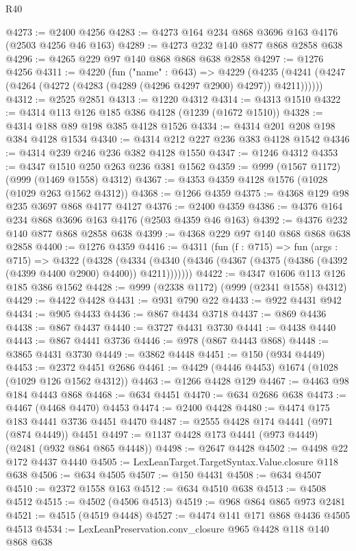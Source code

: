\begin{lexlean}{R40}
\begin{coremodule}
@4273 := @2400 @4256
@4283 := @4273 @164 @234 @868 @3696 @163 @4176 (@2503 @4256 @46 @163)
@4289 := @4273 @232 @140 @877 @868 @2858 @638
@4296 := @4265 @229 @97 @140 @868 @868 @638 @2858
@4297 := @1276 @4256
@4311 := @4220
    (fun ("name" : @643) =>
    @4229 (@4235 (@4241 (@4247 (@4264 (@4272 (@4283 (@4289 (@4296 @4297 @2900) @4297)) @4211))))))
@4312 := @2525 @2851
@4313 := @1220 @4312
@4314 := @4313 @1510
@4322 := @4314 @113 @126 @185 @386 @4128 (@1239 (@1672 @1510))
@4328 := @4314 @188 @89 @198 @385 @4128 @1526
@4334 := @4314 @201 @208 @198 @384 @4128 @1534
@4340 := @4314 @212 @227 @236 @383 @4128 @1542
@4346 := @4314 @239 @246 @236 @382 @4128 @1550
@4347 := @1246 @4312
@4353 := @4347 @1510 @250 @263 @236 @381 @1562
@4359 := @999 (@1567 @1172) (@999 (@1469 @1558) @4312)
@4367 := @4353 @4359 @4128 @1576 (@1028 (@1029 @263 @1562 @4312))
@4368 := @1266 @4359
@4375 := @4368 @129 @98 @235 @3697 @868 @4177 @4127
@4376 := @2400 @4359
@4386 := @4376 @164 @234 @868 @3696 @163 @4176 (@2503 @4359 @46 @163)
@4392 := @4376 @232 @140 @877 @868 @2858 @638
@4399 := @4368 @229 @97 @140 @868 @868 @638 @2858
@4400 := @1276 @4359
@4416 := @4311
    (fun (f : @715) =>
    fun (args : @715) =>
    @4322
      (@4328
        (@4334 (@4340 (@4346 (@4367 (@4375 (@4386 (@4392 (@4399 @4400 @2900) @4400)) @4211)))))))
@4422 := @4347 @1606 @113 @126 @185 @386 @1562
@4428 := @999 (@2338 @1172) (@999 (@2341 @1558) @4312)
@4429 := @4422 @4428
@4431 := @931 @790 @22
@4433 := @922 @4431 @942
@4434 := @905 @4433
@4436 := @867 @4434 @3718
@4437 := @869 @4436
@4438 := @867 @4437
@4440 := @3727 @4431 @3730
@4441 := @4438 @4440
@4443 := @867 @4441 @3736
@4446 := @978 (@867 @4443 @868)
@4448 := @3865 @4431 @3730
@4449 := @3862 @4448
@4451 := @150 (@934 @4449)
@4453 := @2372 @4451 @2686
@4461 := @4429 (@4446 @4453) @1674 (@1028 (@1029 @126 @1562 @4312))
@4463 := @1266 @4428 @129
@4467 := @4463 @98 @184 @4443 @868
@4468 := @634 @4451
@4470 := @634 @2686 @638
@4473 := @4467 (@4468 @4470) @4453
@4474 := @2400 @4428
@4480 := @4474 @175 @183 @4441 @3736 @4451 @4470
@4487 := @2555 @4428 @174 @4441 (@971 (@874 @4449)) @4451
@4497 := @1137 @4428 @173 @4441 (@973 @4449) (@2481 (@932 @864 @865 @4448))
@4498 := @2647 @4428
@4502 := @4498 @22 @172 @4437 @4440
@4505 := LexLeanTarget.TargetSyntax.Value.closure @118 @638
@4506 := @634 @4505
@4507 := @150 @4431
@4508 := @634 @4507
@4510 := @2372 @1558 @163
@4512 := @634 @4510 @638
@4513 := @4508 @4512
@4515 := @4502 (@4506 @4513)
@4519 := @968 @864 @865 @973 @2481
@4521 := @4515 (@4519 @4448)
@4527 := @4474 @141 @171 @868 @4436 @4505 @4513
@4534 := LexLeanPreservation.conv_closure @965 @4428 @118 @140 @868 @638

\end{coremodule}
\end{lexlean}
